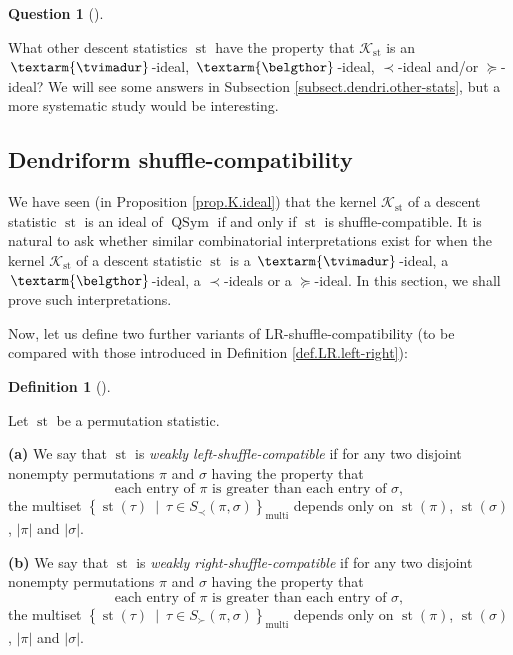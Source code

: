 \documentclass[numbers=enddot,12pt,final,onecolumn,notitlepage]{scrartcl}%
\theoremstyle{definition}
\newtheorem{defi}[theo]{Definition}
\newenvironment{definition}[1][]
{\begin{defi}[#1]\begin{leftbar}}
{\end{leftbar}\end{defi}}
\newtheorem{quest}[theo]{Question}
\newenvironment{question}[1][]
{\begin{quest}[#1]\begin{leftbar}}
{\end{leftbar}\end{quest}}
\newenvironment{question}[1][Question]{\noindent\textbf{#1.} }{\ \rule{0.5em}{0.5em}}
\newenvironment{verlong}{}{}
\newcommand{\tvi}{\left. \textarm{\tvimadur} \right.}
\newcommand{\bel}{\left. \textarm{\belgthor} \right.}
\begin{document}
\begin{verlong}
\begin{question}
What other descent statistics $\operatorname*{st}$ have the property that
$\mathcal{K}_{\operatorname*{st}}$ is an $\tvi$-ideal, $\bel$-ideal, $\left.
\prec\right.  $-ideal and/or $\left.  \succeq\right.  $-ideal? We will see
some answers in Subsection \ref{subsect.dendri.other-stats}, but a more
systematic study would be interesting.
\end{question}

\subsection{Dendriform shuffle-compatibility}

We have seen (in Proposition \ref{prop.K.ideal}) that the kernel
$\mathcal{K}_{\operatorname*{st}}$ of a descent statistic $\operatorname*{st}$
is an ideal of $\operatorname*{QSym}$ if and only if $\operatorname*{st}$ is
shuffle-compatible. It is natural to ask whether similar combinatorial
interpretations exist for when the kernel $\mathcal{K}_{\operatorname*{st}}$
of a descent statistic $\operatorname*{st}$ is a $\tvi$-ideal, a $\bel$-ideal,
a $\left.  \prec\right.  $-ideals or a $\left.  \succeq\right.  $-ideal. In
this section, we shall prove such interpretations.

Now, let us define two further variants of LR-shuffle-compatibility (to be
compared with those introduced in Definition \ref{def.LR.left-right}):

\begin{definition}
Let $\operatorname*{st}$ be a permutation statistic.

\textbf{(a)} We say that $\operatorname*{st}$ is \textit{weakly
left-shuffle-compatible} if for any two disjoint nonempty permutations $\pi$
and $\sigma$ having the property that%
\begin{equation}
\text{each entry of }\pi\text{ is greater than each entry of }\sigma,
\label{eq.def.dendri.dsc.weak-ass}%
\end{equation}
the multiset $\left\{  \operatorname*{st}\left(  \tau\right)  \ \mid\ \tau\in
S_{\prec}\left(  \pi,\sigma\right)  \right\}  _{\operatorname*{multi}}$
depends only on $\operatorname*{st}\left(  \pi\right)  $, $\operatorname*{st}%
\left(  \sigma\right)  $, $\left\vert \pi\right\vert $ and $\left\vert
\sigma\right\vert $.

\textbf{(b)} We say that $\operatorname*{st}$ is \textit{weakly
right-shuffle-compatible} if for any two disjoint nonempty permutations $\pi$
and $\sigma$ having the property that%
\[
\text{each entry of }\pi\text{ is greater than each entry of }\sigma,
\]
the multiset $\left\{  \operatorname*{st}\left(  \tau\right)  \ \mid\ \tau\in
S_{\succ}\left(  \pi,\sigma\right)  \right\}  _{\operatorname*{multi}}$
depends only on $\operatorname*{st}\left(  \pi\right)  $, $\operatorname*{st}%
\left(  \sigma\right)  $, $\left\vert \pi\right\vert $ and $\left\vert
\sigma\right\vert $.
\end{definition}


\end{verlong}
\end{document}
